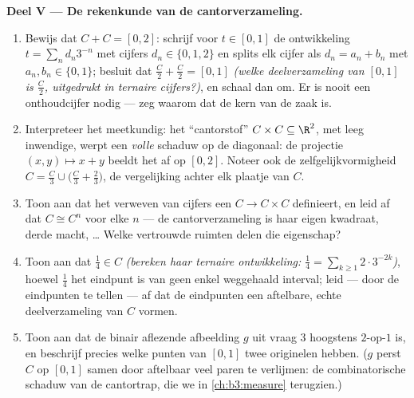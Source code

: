 \begin{problem}
\medskip
\noindent\textbf{Deel V --- De rekenkunde van de
cantorverzameling.}
\begin{enumerate}[resume]
  \item Bewijs dat $C + C = [0, 2]$: schrijf voor $t \in [0, 1]$
        de ontwikkeling $t = \sum_n d_n3^{-n}$ met cijfers $d_n
        \in \{0, 1, 2\}$ en splits elk cijfer als $d_n = a_n +
        b_n$ met $a_n, b_n \in \{0, 1\}$; besluit dat $\frac C2 +
        \frac C2 = [0, 1]$ \emph{(welke deelverzameling van
        $[0,1]$ is $\frac C2$, uitgedrukt in ternaire cijfers?)},
        en schaal dan om. Er is nooit een onthoudcijfer nodig ---
        zeg waarom dat de kern van de zaak is.
  \item Interpreteer het meetkundig: het ``cantorstof'' $C \times
        C \subseteq \R^2$, met leeg inwendige, werpt een
        \emph{volle} schaduw op de diagonaal: de projectie $(x, y)
        \mapsto x + y$ beeldt het af op $[0, 2]$. Noteer ook de
        zelfgelijkvormigheid $C = \frac C3 \cup \bigl(\frac C3 +
        \frac23\bigr)$, de vergelijking achter elk plaatje van
        $C$.
  \item Toon aan dat het verweven van cijfers een  $C
        \to C \times C$ definieert, en leid af dat $C \cong C^n$
        voor elke $n$ --- de cantorverzameling is haar eigen
        kwadraat, derde macht, \dots{} Welke vertrouwde ruimten
        delen die eigenschap?
  \item Toon aan dat $\frac14 \in C$ \emph{(bereken haar ternaire
        ontwikkeling: $\frac14 = \sum_{k\geq1} 2\cdot3^{-2k}$)},
        hoewel $\frac14$ het eindpunt is van geen enkel
        weggehaald interval; leid --- door de eindpunten te tellen
        --- af dat de eindpunten een aftelbare, echte
        deelverzameling van $C$ vormen.
  \item Toon aan dat de binair aflezende afbeelding $g$ uit vraag
        3 hoogstens $2$-op-$1$ is, en beschrijf precies welke
        punten van $[0,1]$ twee originelen hebben. ($g$ perst $C$
        op $[0,1]$ samen door aftelbaar veel paren te verlijmen:
        de combinatorische schaduw van de cantortrap, die we in
        \cref{ch:b3:measure} terugzien.)
\end{enumerate}


\end{problem}
